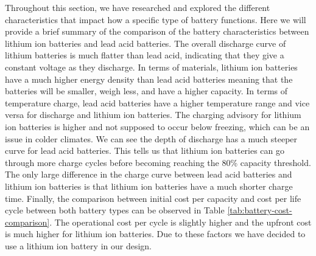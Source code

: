 Throughout this section, we have researched and explored the different characteristics that impact how a specific type of battery functions. Here we will provide a brief summary of the comparison of the battery characteristics between lithium ion batteries and lead acid batteries. The overall discharge curve of lithium batteries is much flatter than lead acid, indicating that they give a constant voltage as they discharge. In terms of materials, lithium ion batteries have a much higher energy density than lead acid batteries meaning that the batteries will be smaller, weigh less, and have a higher capacity. In terms of temperature charge, lead acid batteries have a higher temperature range and vice versa for discharge and lithium ion batteries. The charging advisory for lithium ion batteries is higher and not supposed to occur below freezing, which can be an issue in colder climates. We can see the depth of discharge has a much steeper curve for lead acid batteries. This tells us that lithium ion batteries can go through more charge cycles before becoming reaching the 80\% capacity threshold. The only large difference in the charge curve between lead acid batteries and lithium ion batteries is that lithium ion batteries have a much shorter charge time. Finally, the comparison between initial cost per capacity and cost per life cycle between both battery types can be observed in Table \ref{tab:battery-cost-comparison}. The operational cost per cycle is slightly higher and the upfront cost is much higher for lithium ion batteries. Due to these factors we have decided to use a lithium ion battery in our design.

